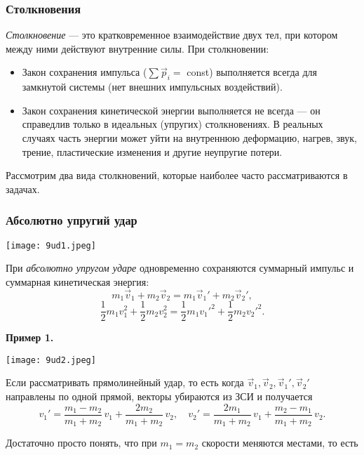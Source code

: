 \documentclass[12pt, a4paper]{article}%
\begin{document}
\subsubsection*{Столкновения}
\textit{Столкновение} — это кратковременное взаимодействие двух тел, при котором между ними действуют внутренние силы.  
При столкновении:
\begin{itemize}
  \item Закон сохранения импульса (\(\sum\vec p_i=\) const) выполняется всегда для замкнутой системы (нет внешних импульсных воздействий).
  \item Закон сохранения кинетической энергии выполняется не всегда — он справедлив только в идеальных (упругих) столкновениях. В реальных случаях часть энергии может уйти на внутреннюю деформацию, нагрев, звук, трение, пластические изменения и другие неупругие потери.
\end{itemize}

Рассмотрим два вида столкновений, которые наиболее часто рассматриваются в задачах.

\subsubsection*{Абсолютно упругий удар}

\begin{center}
\texttt{[image: 9ud1.jpeg]}
\label{fig:mpr}
\end{center}

При \textit{абсолютно упругом ударе} одновременно сохраняются суммарный импульс и суммарная кинетическая энергия:
\[
m_1\vec v_{1}+m_2\vec v_{2}=m_1\vec v_{1}'+m_2\vec v_{2}',
\]
\[
\frac12m_1v_{1}^2+\frac12m_2v_{2}^2
=\frac12m_1{v_{1}'}^2+\frac12m_2{v_{2}'}^2.
\]

\textbf{Пример 1.}

\begin{center}
\texttt{[image: 9ud2.jpeg]}
\label{fig:mpr}
\end{center}

Если рассматривать прямолинейный удар, то есть когда $\vec v_1, \vec v_2, \vec v_1', \vec v_2'$ направлены по одной прямой, векторы убираются из ЗСИ и получается 
\[
v_{1}'=\frac{m_1-m_2}{m_1+m_2}\,v_{1}+\frac{2m_2}{m_1+m_2}\,v_{2}, 
\quad
v_{2}'=\frac{2m_1}{m_1+m_2}\,v_{1}+\frac{m_2-m_1}{m_1+m_2}\,v_{2}.
\]

Достаточно просто понять, что при $m_1 = m_2$ скорости меняются местами, то есть
\end{document}

